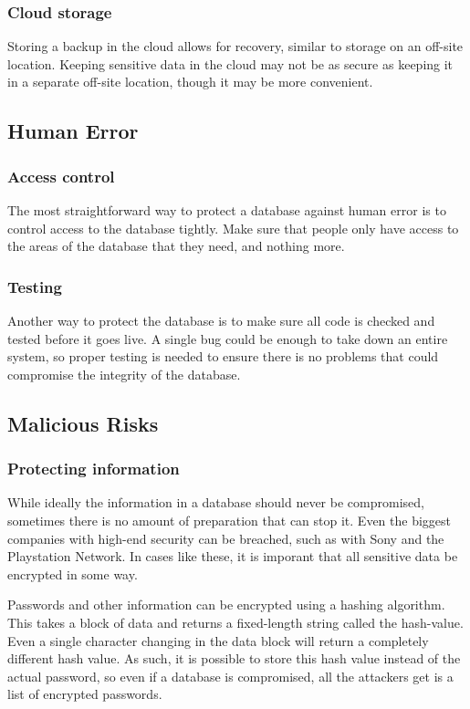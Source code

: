 \documentclass[11pt, twocolumn]{article}
\begin{document}
\subsubsection{Cloud storage}

Storing a backup in the cloud allows for recovery, similar to storage on an off-site location. Keeping sensitive data in the cloud may not be as secure as keeping it in a separate off-site location\cite{cloud}, though it may be more convenient.

\subsection{Human Error}
\subsubsection{Access control}
The most straightforward way to protect a database against human error is to control access to the database tightly. Make sure that people only have access to the areas of the database that they need, and nothing more. 

\subsubsection{Testing}

Another way to protect the database is to make sure all code is checked and tested before it goes live. A single bug could be enough to take down an entire system, so proper testing is needed to ensure there is no problems that could compromise the integrity of the database.

\subsection{Malicious Risks}
\subsubsection{Protecting information}

While ideally the information in a database should never be compromised, sometimes there is no amount of preparation that can stop it. Even the biggest companies with high-end security can be breached, such as with Sony and the Playstation Network.\cite{sony} In cases like these, it is imporant that all sensitive data be encrypted in some way.

Passwords and other information can be encrypted using a hashing algorithm. This takes a block of data and returns a fixed-length string called the hash-value. Even a single character changing in the data block will return a completely different hash value. As such, it is possible to store this hash value instead of the actual password, so even if a database is compromised, all the attackers get is a list of encrypted passwords.
\end{document}
